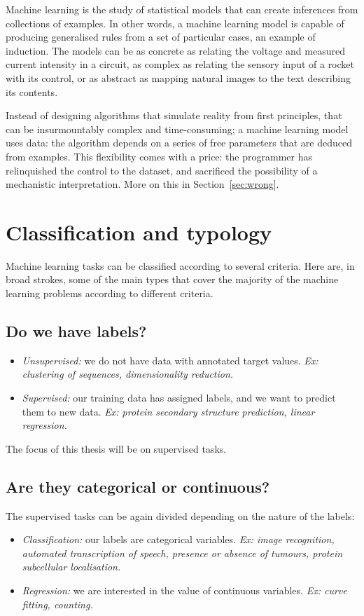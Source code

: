 
Machine learning is the study of statistical models that can create inferences from collections of examples. 
In other words, a machine learning model is capable of producing generalised rules from a set of particular cases, an example of induction.
The models can be as concrete as relating the voltage and measured current intensity in a circuit, as complex as relating the sensory input of a rocket with its control, or as abstract as mapping natural images to the text describing its contents.

Instead of designing algorithms that simulate reality from first principles, that can be insurmountably complex and time-consuming; a machine learning model uses data: the algorithm depends on a series of free parameters that are deduced from examples.
This flexibility comes with a price: the programmer has relinquished the control to the dataset, and sacrificed the possibility of a mechanistic interpretation.
More on this in Section~\ref{sec:wrong}.

\section{Classification and typology}
Machine learning tasks can be classified according to several criteria.
Here are, in broad strokes, some of the main types that cover the majority of the machine learning problems according to different criteria.

\subsection{Do we have labels?}
\begin{itemize}
\item \emph{Unsupervised:} we do not have data with annotated target values. \emph{Ex: clustering of \DNA{} sequences, dimensionality reduction.}
\item \emph{Supervised:} our training data has assigned labels, and we want to predict them to new data. \emph{Ex: protein secondary structure prediction, linear regression.}
\end{itemize}

The focus of this thesis will be on supervised tasks.

\subsection[Categorical or continuous?]{Are they categorical or continuous?}
The supervised tasks can be again divided depending on the nature of the labels:
\begin{itemize}
\item \emph{Classification:} our labels are categorical variables. \emph{Ex: image recognition, automated transcription of speech, presence or absence of tumours, protein subcellular localisation.}
\item \emph{Regression:} we are interested in the value of continuous variables. \emph{Ex: curve fitting, counting.}
\end{itemize}

